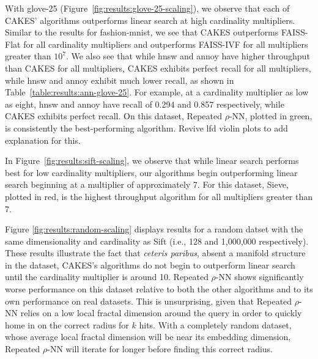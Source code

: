 With glove-25 (Figure~\ref{fig:results:glove-25-scaling}), we observe that each of CAKES' algorithms outperforms linear search at high cardinality multipliers. Similar to the results for fashion-mnist, we see that CAKES outperforms FAISS-Flat for all cardinality multipliers and outperforms FAISS-IVF for all multipliers greater than $10^{7}$. We also see that while hnsw and annoy have higher throughput than CAKES for all multipliers, CAKES exhibits perfect recall for all multipliers, while hnsw and annoy exhibit much lower recall, as shown in Table~\ref{table:results:ann-glove-25}. For example, at a cardinality multiplier as low as eight, hnsw and annoy have recall of 0.294 and 0.857 respectively, while CAKES exhibits perfect recall.
On this dataset, Repeated $\rho$-NN, plotted in green, is consistently the best-performing algorithm. {\color{red} Revive lfd violin plots to add explanation for this.}



In Figure~\ref{fig:results:sift-scaling}, we observe that while linear search performs best for low cardinality multipliers, our algorithms begin outperforming linear search beginning at a multiplier of approximately 7. 
For this dataset, Sieve, plotted in red, is the highest throughput algorithm for all multipliers greater than 7. 

Figure \ref{fig:results:random-scaling} displays results for a random datset with the same dimensionality and cardinality as Sift (i.e., 128 and 1,000,000 respectively). 
These results illustrate the fact that \emph{ceteris paribus}, absent a manifold structure in the dataset, CAKES's algorithms do not begin to outperform linear search until the cardinality multiplier is around 10. 
Repeated $\rho$-NN shows significantly worse performance on this dataset relative to both the other algorithms and to its own performance on real datasets. 
This is unsurprising, given that Repeated $\rho$-NN relies on a low local fractal dimension around the query in order to quickly home in on the correct radius for $k$ hits. 
With a completely random dataset, whose average local fractal dimension will be near its embedding dimension, Repeated $\rho$-NN will iterate for longer before finding this correct radius. 

